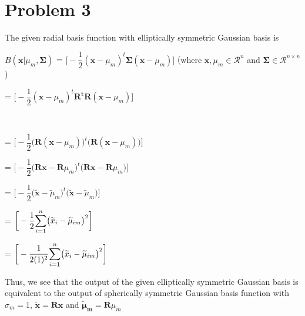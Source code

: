 \documentclass[11pt]{article}
\begin{document}
\begin{center}

\ \\
\end{center}

\section*{Problem 3}

\vspace{5 mm}
\noindent

The given radial basis function with elliptically symmetric Gaussian basis is

$B(\mathbf{x}|\mu_m,\boldsymbol \Sigma)$ 
=  $\bigg[  -\dfrac{1}{2}(\mathbf{x} - 
\mu_{m} )^t\boldsymbol \Sigma (\mathbf{x} - \mu_{m} )    \bigg]$
\text ({where $\mathbf{x}, \mu_{m}  \in \mathcal{R}^n$ and $\boldsymbol \Sigma \in  \mathcal{R}^{n \times n}$)}

= $\bigg[  -\dfrac{1}{2}(\mathbf{x} - 
\mu_{m} )^t\mathbf {R^tR} (\mathbf{x} - \mu_{m} )    \bigg]$

 \\

=  $\bigg[  -\dfrac{1}{2}\bigg(\mathbf {R}(\mathbf{x} - 
\mu_{m} )\bigg)^t \bigg(\mathbf {R}(\mathbf{x} - \mu_{m}) \bigg)    \bigg]$ 


=  $\bigg[  -\dfrac{1}{2}\bigg(\mathbf {R}\mathbf{x} - 
\mathbf {R}\mu_{m} \bigg)^t \bigg(\mathbf {R}\mathbf{x} - 
\mathbf {R}\mu_{m} \bigg)  \bigg]$ 


=  $\bigg[  -\dfrac{1}{2}\bigg(\widetilde{\mathbf{x}} - 
\widetilde\mu_m  \bigg)^t \bigg(\widetilde{\mathbf{x}} - 
\widetilde\mu_m  \bigg)  \bigg]$ 


=  $\bigg[  -\dfrac{1}{2}\mathlarger{\sum}_{i = 1}^{n}\big(\widetilde{x}_i - 
\widetilde {\mu}_{im} \big)^2 \bigg]$ 


=  $\bigg[  -\dfrac{1}{2(1)^2}\mathlarger{\sum}_{i = 1}^{n}\big(\widetilde{x}_i - 
\widetilde {\mu}_{im} \big)^2 \bigg]$ 


\vspace{5 mm}
\noindent
Thus, we see that the output of the given elliptically symmetric Gaussian basis is
equivalent to the output of spherically symmetric Gaussian
basis function  with $\sigma_m = 1$, $\widetilde{\mathbf{x}} = \mathbf {R}\mathbf{x} $
and $\mathbf{\widetilde\mu_m} = \mathbf {R}\mu_{m}$
\end{document}
